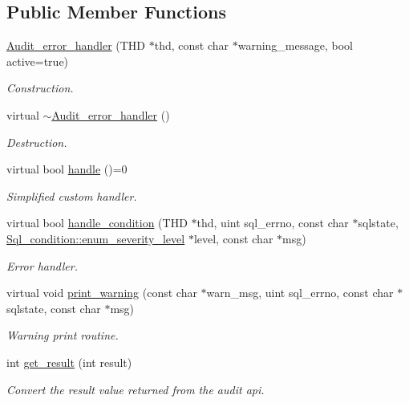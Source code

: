 \subsection*{Public Member Functions}
\begin{DoxyCompactItemize}
\item 
\mbox{\hyperlink{classAudit__error__handler_ad70a6f131999a8e3b187f833dbe8d1c2}{Audit\+\_\+error\+\_\+handler}} (T\+HD $\ast$thd, const char $\ast$warning\+\_\+message, bool active=true)
\begin{DoxyCompactList}\small\item\em Construction. \end{DoxyCompactList}\item 
\mbox{\label{classAudit__error__handler_a75fb736aa4997a6e4908443a9937cf72}} 
virtual \mbox{\hyperlink{classAudit__error__handler_a75fb736aa4997a6e4908443a9937cf72}{$\sim$\+Audit\+\_\+error\+\_\+handler}} ()
\begin{DoxyCompactList}\small\item\em Destruction. \end{DoxyCompactList}\item 
virtual bool \mbox{\hyperlink{classAudit__error__handler_aa674ae49782d768001e7bd1d11f16c68}{handle}} ()=0
\begin{DoxyCompactList}\small\item\em Simplified custom handler. \end{DoxyCompactList}\item 
virtual bool \mbox{\hyperlink{classAudit__error__handler_a5b6e8df5f80e0b00026eb90f90622657}{handle\+\_\+condition}} (T\+HD $\ast$thd, uint sql\+\_\+errno, const char $\ast$sqlstate, \mbox{\hyperlink{classSql__condition_ab0602581e19cddb609bfe10c44be4e83}{Sql\+\_\+condition\+::enum\+\_\+severity\+\_\+level}} $\ast$level, const char $\ast$msg)
\begin{DoxyCompactList}\small\item\em Error handler. \end{DoxyCompactList}\item 
virtual void \mbox{\hyperlink{classAudit__error__handler_ac3b06f010e4c72aee47ae6123e49ecc4}{print\+\_\+warning}} (const char $\ast$warn\+\_\+msg, uint sql\+\_\+errno, const char $\ast$sqlstate, const char $\ast$msg)
\begin{DoxyCompactList}\small\item\em Warning print routine. \end{DoxyCompactList}\item 
int \mbox{\hyperlink{classAudit__error__handler_a44d7850d3d9d50f3eb71c3f9ab9cf9dc}{get\+\_\+result}} (int result)
\begin{DoxyCompactList}\small\item\em Convert the result value returned from the audit api. \end{DoxyCompactList}\end{DoxyCompactItemize}


